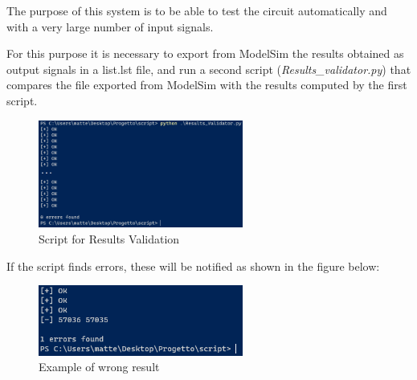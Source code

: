 The purpose of this system is to be able to test the circuit automatically and with a very large number of input signals.

For this purpose it is necessary to export from ModelSim the results obtained as output signals in a list.lst file, and run a second script (\textit{Results\_validator.py}) that compares the file exported from ModelSim with the results computed by the first script.

\begin{figure}[H]
    \centering
    \includegraphics[width=0.6\textwidth]{img/Chapter4/Validator.png}
    \caption{Script for Results Validation}
    \label{fig:Script2}
\end{figure}

If the script finds errors, these will be notified as shown in the figure below:

\begin{figure}[H]
    \centering
    \includegraphics[width=0.6\textwidth]{img/Chapter4/Validator2.png}
    \caption{Example of wrong result}
    \label{fig:Script3}
\end{figure}